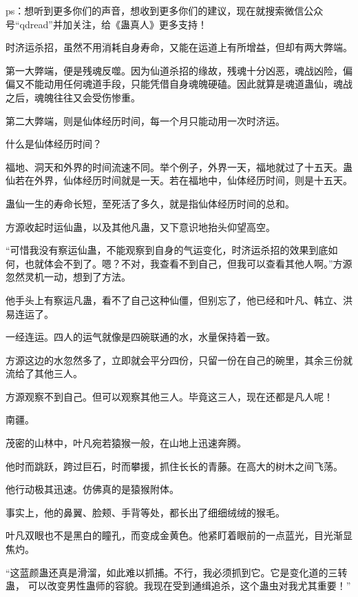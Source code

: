 
\begin{this_body}

ps：想听到更多你们的声音，想收到更多你们的建议，现在就搜索微信公众号“qdread”并加关注，给《蛊真人》更多支持！

时济运杀招，虽然不用消耗自身寿命，又能在运道上有所增益，但却有两大弊端。

第一大弊端，便是残魂反噬。因为仙道杀招的缘故，残魂十分凶恶，魂战凶险，偏偏又不能动用任何魂道手段，只能凭借自身魂魄硬磕。因此就算是魂道蛊仙，魂战之后，魂魄往往又会受伤惨重。

第二大弊端，则是仙体经历时间，每一个月只能动用一次时济运。

什么是仙体经历时间？

福地、洞天和外界的时间流速不同。举个例子，外界一天，福地就过了十五天。蛊仙若在外界，仙体经历时间就是一天。若在福地中，仙体经历时间，则是十五天。

蛊仙一生的寿命长短，至死活了多久，就是指仙体经历时间的总和。

方源收起时运仙蛊，以及其他凡蛊，又下意识地抬头仰望高空。

“可惜我没有察运仙蛊，不能观察到自身的气运变化，时济运杀招的效果到底如何，也就体会不到了。嗯？不对，我查看不到自己，但我可以查看其他人啊。”方源忽然灵机一动，想到了方法。

他手头上有察运凡蛊，看不了自己这种仙僵，但别忘了，他已经和叶凡、韩立、洪易连运了。

一经连运。四人的运气就像是四碗联通的水，水量保持着一致。

方源这边的水忽然多了，立即就会平分四份，只留一份在自己的碗里，其余三份就流给了其他三人。

方源观察不到自己。但可以观察其他三人。毕竟这三人，现在还都是凡人呢！

南疆。

茂密的山林中，叶凡宛若猿猴一般，在山地上迅速奔腾。

他时而跳跃，跨过巨石，时而攀援，抓住长长的青藤。在高大的树木之间飞荡。

他行动极其迅速。仿佛真的是猿猴附体。

事实上，他的鼻翼、脸颊、手背等处，都长出了细细绒绒的猴毛。

叶凡双眼也不是黑白的瞳孔，而变成金黄色。他紧盯着眼前的一点蓝光，目光渐显焦灼。

“这蓝颜蛊还真是滑溜，如此难以抓捕。不行，我必须抓到它。它是变化道的三转蛊， 可以改变男性蛊师的容貌。我现在受到通缉追杀，这个蛊虫对我尤其重要！”


\end{this_body}

